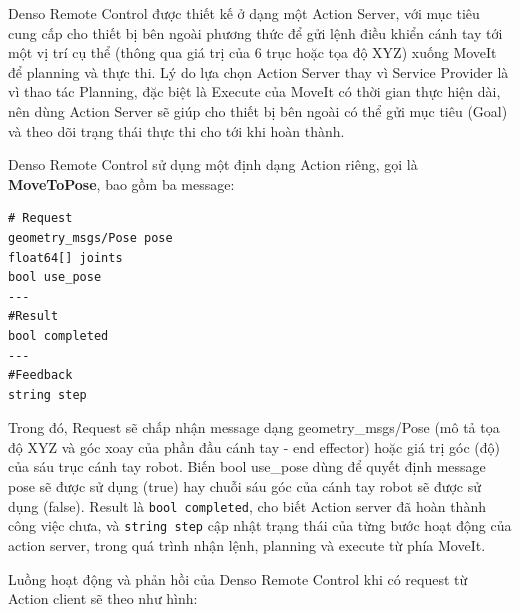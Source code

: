 Denso Remote Control được thiết kế ở dạng một Action Server, với mục tiêu cung cấp cho thiết bị bên ngoài phương thức để gửi lệnh điều khiển cánh tay tới một vị trí cụ thể (thông qua giá trị của 6 trục hoặc tọa độ XYZ) xuống MoveIt để planning và thực thi. Lý do lựa chọn Action Server thay vì Service Provider là vì thao tác Planning, đặc biệt là Execute của MoveIt có thời gian thực hiện dài, nên dùng Action Server sẽ giúp cho thiết bị bên ngoài có thể gửi mục tiêu (Goal) và theo dõi trạng thái thực thi cho tới khi hoàn thành. 

Denso Remote Control sử dụng một định dạng Action riêng, gọi là \textbf{MoveToPose}, bao gồm ba message:

\begin{lstlisting}[language={}]
# Request
geometry_msgs/Pose pose
float64[] joints
bool use_pose
---
#Result
bool completed
---
#Feedback
string step
\end{lstlisting}

Trong đó, Request sẽ chấp nhận message dạng geometry\_msgs/Pose (mô tả tọa độ XYZ và góc xoay của phần đầu cánh tay - end effector) hoặc giá trị góc (độ) của sáu trục cánh tay robot. Biến bool use\_pose dùng để quyết định message pose sẽ được sử dụng (true) hay chuỗi sáu góc của cánh tay robot sẽ được sử dụng (false). Result là \lstinline[style=inlinecode]{bool completed}, cho biết Action server đã hoàn thành công việc chưa, và \lstinline[style=inlinecode]{string step} cập nhật trạng thái của từng bước hoạt động của action server, trong quá trình nhận lệnh, planning và execute từ phía MoveIt.

Luồng hoạt động và phản hồi của Denso Remote Control khi có request từ Action client sẽ theo như hình:

